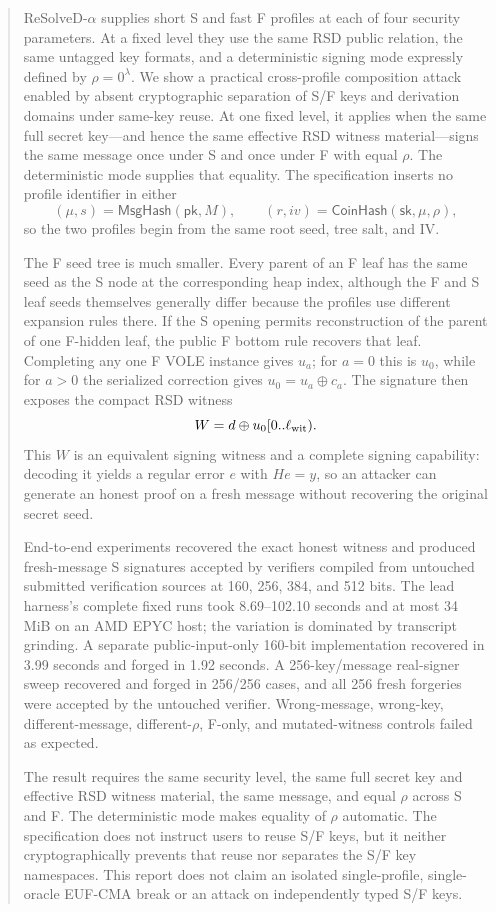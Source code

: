 \documentclass[11pt,a4paper]{article}
\newcommand{\xor}{\mathbin{\oplus}}
\newcommand{\pk}{\ensuremath{\mathsf{pk}}}
\newcommand{\sk}{\ensuremath{\mathsf{sk}}}
\newcommand{\MsgHash}{\ensuremath{\mathsf{MsgHash}}}
\newcommand{\CoinHash}{\ensuremath{\mathsf{CoinHash}}}
\begin{document}
\begin{abstract}
ReSolveD-$\alpha$ supplies short S and fast F profiles at each of four security
parameters.  At a fixed level they use the same RSD public relation, the same
untagged key formats, and a deterministic signing mode expressly defined by
$\rho=0^\lambda$.  We show a practical cross-profile composition attack
enabled by absent cryptographic separation of S/F keys and derivation domains
under same-key reuse.  At one fixed level, it applies when the same full secret
key---and hence the same effective RSD witness material---signs the same message
once under S and once under F with equal $\rho$.  The deterministic mode supplies
that equality.  The specification inserts no profile identifier in either
\[
 (\mu,s)=\MsgHash(\pk,M),\qquad
 (r,iv)=\CoinHash(\sk,\mu,\rho),
\]
so the two profiles begin from the same root seed, tree salt, and IV.

The F seed tree is much smaller.  Every parent of an F leaf has the same seed as
the S node at the corresponding heap index, although the F and S leaf seeds
themselves generally differ because the profiles use different expansion rules
there.  If the S opening permits reconstruction of the parent of one F-hidden
leaf, the public F bottom rule recovers that leaf.  Completing any one F VOLE
instance gives $u_a$; for $a=0$ this is $u_0$, while for $a>0$ the serialized
correction gives $u_0=u_a\xor c_a$.  The signature then exposes the compact RSD
witness
\[
       W=d\xor u_0[0..\ell_{\rm wit}).
\]
This $W$ is an equivalent signing witness and a complete signing capability:
decoding it yields a regular error $e$ with $He=y$, so an attacker can generate
an honest proof on a fresh message without recovering the original secret seed.

End-to-end experiments recovered the exact honest witness and produced
fresh-message S signatures accepted by verifiers compiled from untouched
submitted verification sources at 160, 256, 384, and 512 bits.  The lead
harness's complete fixed runs took 8.69--102.10 seconds and at most 34 MiB on an
AMD EPYC host; the variation is dominated by transcript grinding.  A separate public-input-only
160-bit implementation recovered in 3.99 seconds and forged in 1.92 seconds.
A 256-key/message real-signer sweep recovered and forged in 256/256 cases, and
all 256 fresh forgeries were accepted by the untouched verifier.  Wrong-message,
wrong-key, different-message, different-$\rho$, F-only, and mutated-witness
controls failed as expected.

The result requires the same security level, the same full secret key and
effective RSD witness material, the same message, and equal $\rho$ across S and
F.  The deterministic mode makes equality of $\rho$ automatic.  The
specification does not instruct users to reuse S/F keys, but it neither
cryptographically prevents that reuse nor separates the S/F key namespaces.
This report does not claim an isolated single-profile, single-oracle EUF-CMA
break or an attack on independently typed S/F keys.
\end{abstract}
\end{document}
